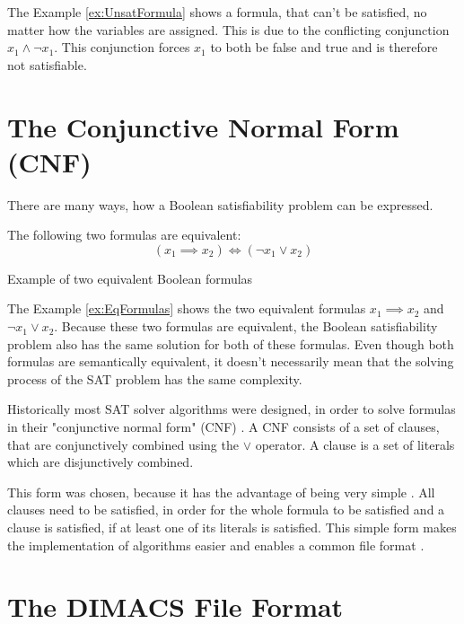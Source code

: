 The Example \ref{ex:UnsatFormula} shows a formula, that can't be satisfied, no matter how the variables are assigned. This is due to the conflicting conjunction $x_1 \wedge \neg x_1$. This conjunction forces $x_1$ to both be false and true and is therefore not satisfiable.

\section{The Conjunctive Normal Form (CNF)}

There are many ways, how a Boolean satisfiability problem can be expressed.

\begin{example}
\begin{leftbar}
The following two formulas are equivalent:
\begin{displaymath}
(x_1 \implies x_2) \iff (\neg x_1 \vee x_2)
\end{displaymath}
\end{leftbar}
\caption{Example of two equivalent Boolean formulas}
\label{ex:EqFormulas}
\end{example}

The Example \ref{ex:EqFormulas} shows the two equivalent formulas $x_1 \implies x_2$ and $\neg x_1 \vee x_2$. Because these two formulas are equivalent, the Boolean satisfiability problem also has the same solution for both of these formulas. Even though both formulas are semantically equivalent, it doesn't necessarily mean that the solving process of the SAT problem has the same complexity.

Historically most SAT solver algorithms were designed, in order to solve formulas in their "conjunctive normal form" (CNF) \cite{biere2009handbook}. A CNF consists of a set of clauses, that are conjunctively combined using the $\vee$ operator. A clause is a set of literals which are disjunctively combined. \cite{biere2009handbook}

This form was chosen, because it has the advantage of being very simple \cite{biere2009handbook}. All clauses need to be satisfied, in order for the whole formula to be satisfied and a clause is satisfied, if at least one of its literals is satisfied. This simple form makes the implementation of algorithms easier and enables a common file format \cite{biere2009handbook}.

\section{The DIMACS File Format}

